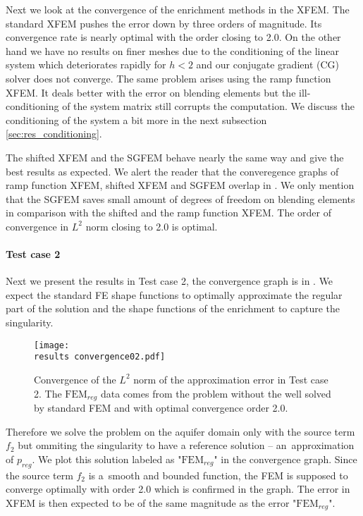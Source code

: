 Next we look at the convergence of the enrichment methods in the XFEM.
The standard XFEM pushes the error down by three orders of magnitude. Its convergence rate is nearly optimal with the order closing to 2.0.
On the other hand we have no results on finer meshes due to the conditioning of the linear system
which deteriorates rapidly for $h<2$ and our conjugate gradient (CG) solver does not converge.
The same problem arises using the ramp function XFEM. It deals better with the error on blending elements but the
ill-conditioning of the system matrix still corrupts the computation. We discuss the conditioning of the system 
a bit more in the next subsection \ref{sec:res_conditioning}.

The shifted XFEM and the SGFEM behave nearly the same way and give the best results as expected.
We alert the reader that the converegence graphs of ramp function XFEM, shifted XFEM and SGFEM overlap in .
We only mention that the SGFEM saves small amount of degrees of freedom on blending elements in comparison
with the shifted and the ramp function XFEM. The order of convergence in $L^2$ norm closing to 2.0 is optimal.


\paragraph{Test case 2}
Next we present the results in Test case 2, the convergence graph is in .
We expect the standard FE shape functions to optimally approximate the regular part of the solution
and the shape functions of the enrichment to capture the singularity.
%
\begin{figure}[!htb]
  \centering    
  \texttt{[image: \\results convergence02.pdf]}
  \caption[Convergence graph in Test case 2]{Convergence of the $L^2$ norm of the approximation error in Test case 2. The $\textrm{FEM}_{reg}$
  data comes from the problem without the well solved by standard FEM and with optimal convergence order 2.0.}
  \label{fig:convergence02}
\end{figure}
%
Therefore we solve the problem on the aquifer domain only with the source term $f_2$ but ommiting the singularity
to have a reference solution -- an~approximation of $p_{reg}$. We plot this solution labeled as "$\textrm{FEM}_{reg}$" in the convergence graph.
Since the source term $f_2$ is a~smooth and bounded function, the FEM is supposed to converge optimally with order 2.0
which is confirmed in the graph.
The error in XFEM is then expected to be of the same magnitude as the error "$\textrm{FEM}_{reg}$".

